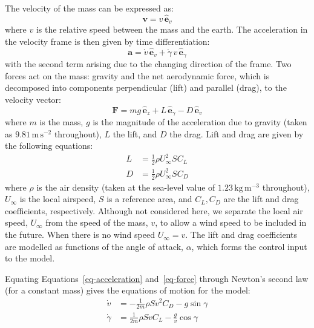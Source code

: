 The velocity of the mass can be expressed as:
\[
    \mathbf{v} = v\,\hat{\mathbf{e}}_v
\]
where $v$ is the relative speed between the mass and the earth. The acceleration in the velocity frame is then given by time differentiation:
\begin{equation}
    \mathbf{a} = \dot{v}\,\hat{\mathbf{e}}_v + \dot{\gamma}\,v\,\hat{\mathbf{e}}_\gamma
    \label{eq-acceleration}
\end{equation}
with the second term arising due to the changing direction of the frame. Two forces act on the mass: gravity and the net aerodynamic force, which is decomposed into components perpendicular (lift) and parallel (drag), to the velocity vector:
\begin{equation}
    \mathbf{F} = mg\,\hat{\mathbf{e}}_z + L\,\hat{\mathbf{e}}_\gamma - D\,\hat{\mathbf{e}}_v
    \label{eq-force}
\end{equation}
where $m$ is the mass, $g$ is the magnitude of the acceleration due to gravity (taken as $9.81\,\text{m}\,\text{s}^{-2}$ throughout), $L$ the lift, and $D$ the drag. Lift and drag are given by the following equations:
\begin{align*}
    L & = \tfrac{1}{2}\rho U_\infty^2 S C_L \\
    D & = \tfrac{1}{2}\rho U_\infty^2 S C_D
\end{align*}
where $\rho$ is the air density (taken at the sea-level value of $1.23\,\text{kg}\,\text{m}^{-3}$ throughout), $U_\infty$ is the local airspeed, $S$ is a reference area, and $C_L, C_D$ are the lift and drag coefficients, respectively. Although not considered here, we separate the local air speed, $U_\infty$ from the speed of the mass, $v$, to allow a wind speed to be included in the future. When there is no wind speed $U_\infty = v$. The lift and drag coefficients are modelled as functions of the angle of attack, $\alpha$, which forms the control input to the model.

Equating Equations~\eqref{eq-acceleration} and~\eqref{eq-force} through Newton's second law (for a constant mass) gives the equations of motion for the model:
\begin{equation}
    \begin{aligned}
        \dot{v}      & = -\frac{1}{2m}\rho S v^2 C_D - g\sin\gamma        \\
        \dot{\gamma} & = \frac{1}{2m}\rho S v C_L - \frac{g}{v}\cos\gamma
    \end{aligned}
    \label{eq-eom}
\end{equation}

